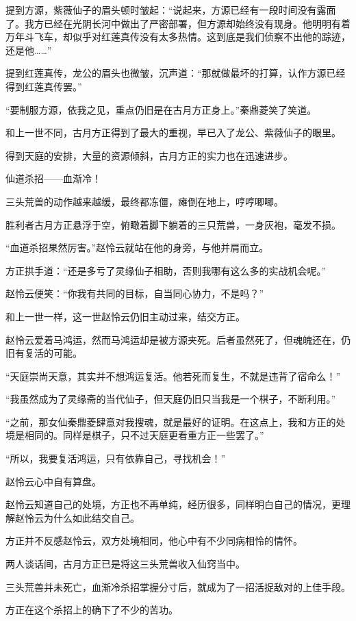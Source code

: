 \begin{this_body}
提到方源，紫薇仙子的眉头顿时皱起：“说起来，方源已经有一段时间没有露面了。我方已经在光阴长河中做出了严密部署，但方源却始终没有现身。他明明有着万年斗飞车，却似乎对红莲真传没有太多热情。这到底是我们侦察不出他的踪迹，还是他……”

提到红莲真传，龙公的眉头也微皱，沉声道：“那就做最坏的打算，认作方源已经得到红莲真传罢。”

“要制服方源，依我之见，重点仍旧是在古月方正身上。”秦鼎菱笑了笑道。

和上一世不同，古月方正得到了最大的重视，早已入了龙公、紫薇仙子的眼里。

得到天庭的安排，大量的资源倾斜，古月方正的实力也在迅速进步。

仙道杀招——血渐冷！

三头荒兽的动作越来越缓，最终都冻僵，瘫倒在地上，哼哼唧唧。

胜利者古月方正悬浮于空，俯瞰着脚下躺着的三只荒兽，一身灰袍，毫发不损。

“血道杀招果然厉害。”赵怜云就站在他的身旁，与他并肩而立。

方正拱手道：“还是多亏了灵缘仙子相助，否则我哪有这么多的实战机会呢。”

赵怜云便笑：“你我有共同的目标，自当同心协力，不是吗？”

和上一世一样，这一世赵怜云仍旧主动过来，结交方正。

赵怜云爱着马鸿运，然而马鸿运却是被方源夹死。后者虽然死了，但魂魄还在，仍旧有复活的可能。

“天庭崇尚天意，其实并不想鸿运复活。他若死而复生，不就是违背了宿命么！”

“我虽然成为了灵缘斋的当代仙子，但天庭仍旧只当我是一个棋子，不断利用。”

“之前，那女仙秦鼎菱肆意对我搜魂，就是最好的证明。在这点上，我和方正的处境是相同的。同样是棋子，只不过天庭更看重方正一些罢了。”

“所以，我要复活鸿运，只有依靠自己，寻找机会！”

赵怜云心中自有算盘。

赵怜云知道自己的处境，方正也不再单纯，经历很多，同样明白自己的情况，更理解赵怜云为什么如此结交自己。

方正并不反感赵怜云，双方处境相同，他心中有不少同病相怜的情怀。

两人谈话间，古月方正已是将这三头荒兽收入仙窍当中。

三头荒兽并未死亡，血渐冷杀招掌握分寸后，就成为了一招活捉敌对的上佳手段。

方正在这个杀招上的确下了不少的苦功。


\end{this_body}
